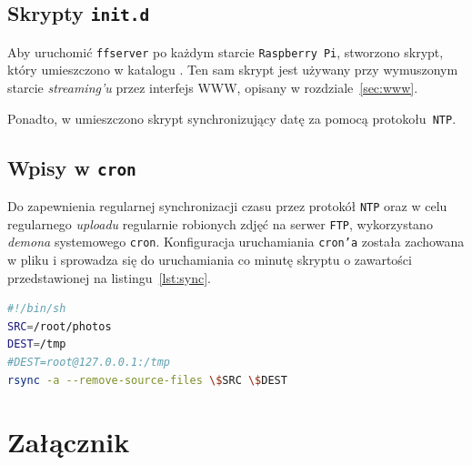 \documentclass{article}
\begin{document}

\subsection{Skrypty \texttt{init.d}}

Aby uruchomić \texttt{ffserver} po każdym starcie \texttt{Raspberry~Pi}, stworzono skrypt, który umieszczono w katalogu . Ten sam skrypt jest używany przy wymuszonym starcie \emph{streaming'u} przez interfejs WWW, opisany w rozdziale~\ref{sec:www}.

Ponadto, w  umieszczono skrypt synchronizujący datę za pomocą protokołu~\texttt{NTP}.


\subsection{Wpisy w \texttt{cron}}

Do zapewnienia regularnej synchronizacji czasu przez protokół \texttt{NTP} oraz w celu regularnego \emph{uploadu} regularnie robionych zdjęć na serwer \texttt{FTP}, wykorzystano \emph{demona} systemowego \texttt{cron}. Konfiguracja uruchamiania \texttt{cron'a} została zachowana w pliku  i sprowadza się do uruchamiania co minutę skryptu  o zawartości przedstawionej na listingu~\ref{lst:sync}.
\begin{lstlisting}[caption={Zawartość pliku \texttt{/root/sync.sh}},label=lst:sync,language=bash,frame=single,breaklines,captionpos=b]
#!/bin/sh
SRC=/root/photos
DEST=/tmp
#DEST=root@127.0.0.1:/tmp
rsync -a --remove-source-files \$SRC \$DEST
\end{lstlisting}


\section{Załącznik}
\end{document}

